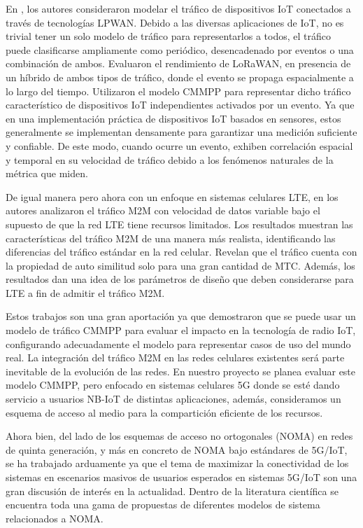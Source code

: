 En \parencite{Gupta2018}, los autores consideraron modelar el tráfico de dispositivos IoT conectados a través de tecnologías LPWAN. Debido a las diversas aplicaciones de IoT, no es trivial tener un solo modelo de tráfico para representarlos a todos, el tráfico puede clasificarse ampliamente como periódico, desencadenado por eventos o una combinación de ambos. Evaluaron el rendimiento de LoRaWAN, en presencia de un híbrido de ambos tipos de tráfico, donde el evento se propaga espacialmente a lo largo del tiempo. Utilizaron el modelo CMMPP para representar dicho tráfico característico de dispositivos IoT independientes activados por un evento. Ya que en una implementación práctica de dispositivos IoT basados en sensores, estos generalmente se implementan densamente para garantizar una medición suficiente y confiable. De este modo, cuando ocurre un evento, exhiben correlación espacial y temporal en su velocidad de tráfico debido a los fenómenos naturales de la métrica que miden. \newline

De igual manera pero ahora con un enfoque en sistemas celulares LTE, en \parencite{Smiljkovic2014} los autores analizaron el tráfico M2M con velocidad de datos variable bajo el supuesto de que la red LTE tiene recursos limitados. Los resultados muestran las características del tráfico M2M de una manera más realista, identificando las diferencias del tráfico estándar en la red celular. Revelan que el tráfico cuenta con la propiedad de auto similitud solo para una gran cantidad de MTC. Además, los resultados dan una idea de los parámetros de diseño que deben considerarse para LTE a fin de admitir el tráfico M2M.\newline

Estos trabajos son una gran aportación ya que demostraron que se puede usar un modelo de tráfico CMMPP para evaluar el impacto en la tecnología de radio IoT, configurando adecuadamente el modelo para representar casos de uso del mundo real. La integración del tráfico M2M en las redes celulares existentes será parte inevitable de la evolución de las redes. En nuestro proyecto se planea evaluar este modelo CMMPP, pero enfocado en sistemas celulares 5G donde se esté dando servicio a usuarios NB-IoT de distintas aplicaciones, además, consideramos un esquema de acceso al medio para la compartición eficiente de los recursos.\newline

Ahora bien, del lado de los esquemas de acceso no ortogonales (NOMA) en redes de quinta generación, y más en concreto de NOMA bajo estándares de 5G/IoT, se ha trabajado arduamente ya que el tema de maximizar la conectividad de los sistemas en escenarios masivos de usuarios esperados en sistemas 5G/IoT son una gran discusión de interés en la actualidad. Dentro de la literatura científica se encuentra toda una gama de propuestas de diferentes modelos de sistema relacionados a NOMA.\newline

